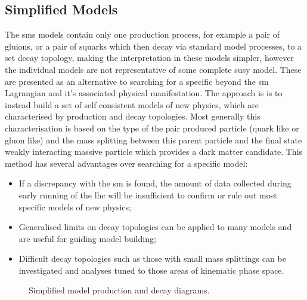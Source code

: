 \subsection{Simplified Models} %
\label{sub:simplified_models}
The \ac{sms} models contain only one production process, for example a pair of gluions, or a pair of squarks which then decay via standard model processes, to a set decay topology, making the interpretation in these models simpler, however the individual models are not representative of some complete \ac{susy} model. 
These are presented as an alternative to searching for a specific beyond the 
\ac{sm} Lagrangian and it's associated physical manifestation. The 
approach is is to  instead build a set of self consistent models of new 
physics, which are characterised by production and decay 
topologies\cite{ArkaniHamed:2007fw}.
Most generally this characterisation is based on the type of the pair produced 
particle (quark like or gluon like) and the mass splitting between this parent 
particle and the final state weakly interacting massive particle which provides 
a dark matter candidate.
This method has several advantages over searching for a specific model:
\begin{itemize}
\item If a discrepancy with the \ac{sm} is found, the amount of data collected  
during early running of the \ac{lhc} will be insufficient to confirm or rule 
out most specific models of new physics;
\item Generalised limits on decay topologies can be applied to many models and 
are useful for guiding model building;
\item Difficult decay topologies such as those with small mass 
splittings can be investigated and analyses tuned to those areas of kinematic 
phase space.
\end{itemize}



\begin{figure}[h!]
    \centering
    \caption{Simplified model production and decay diagrams.}
    \label{fig:T1T2feyn}
\end{figure}



